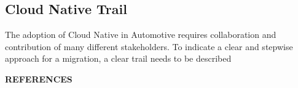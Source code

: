 \documentclass[
12pt,
oneside, 
onehalfspacing, 
nolistspacing, 
parskip, 
chapterinoneline, 
]{AASTCOMPUTER}
\begin{document}
\subsection{Cloud Native Trail}
The adoption of Cloud Native in Automotive requires collaboration and contribution of many different stakeholders. To indicate a clear and stepwise approach for a migration, a clear trail needs to be described 

\newpage
{} 
{}  
\begin{center}{\Large\MakeUppercase{\textbf{References}}\par}\end{center}
\vspace{20pt}
\printbibliography[heading=none]



\end{document}
